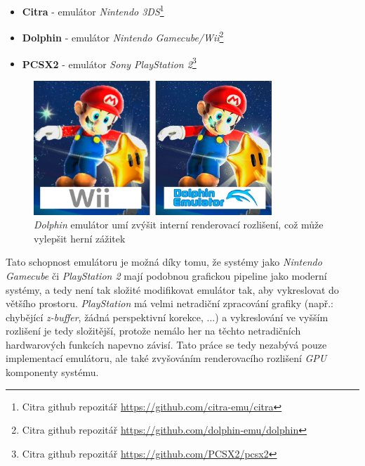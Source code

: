 \begin{itemize}
\item{\textbf{Citra} - emulátor \textit{Nintendo 3DS}\footnote{Citra github repozitář \url{https://github.com/citra-emu/citra}}}
\item{\textbf{Dolphin} - emulátor \textit{Nintendo Gamecube/Wii}\footnote{Citra github repozitář \url{https://github.com/dolphin-emu/dolphin}}}
\item{\textbf{PCSX2} - emulátor \textit{Sony PlayStation 2}\footnote{Citra github repozitář \url{https://github.com/PCSX2/pcsx2}}}
\end{itemize}

\begin{figure}[hbt]
\centering
\includegraphics[width=0.8\textwidth]{obrazky-figures/dolphin-resolution.jpg}
\caption{\textit{Dolphin} emulátor umí zvýšit interní renderovací rozlišení, což může vylepšit herní zážitek}
\label{dolphin-resolution}
\end{figure}

Tato schopnost emulátoru je možná díky tomu, že systémy jako \textit{Nintendo Gamecube} 
či \textit{PlayStation 2} mají podobnou grafickou pipeline jako moderní systémy, 
a tedy není tak složité modifikovat emulátor tak, aby vykreslovat do většího prostoru. \textit{PlayStation} má velmi netradiční zpracování 
grafiky (např.: chybějící \textit{z-buffer}, žádná perspektivní korekce, ...) a vykreslování ve vyšším 
rozlišení je tedy složitější, protože nemálo her na těchto netradičních hardwarových funkcích napevno závisí.
Tato práce se tedy nezabývá pouze implementací emulátoru, ale také zvyšováním renderovacího rozlišení \textit{GPU} komponenty systému.